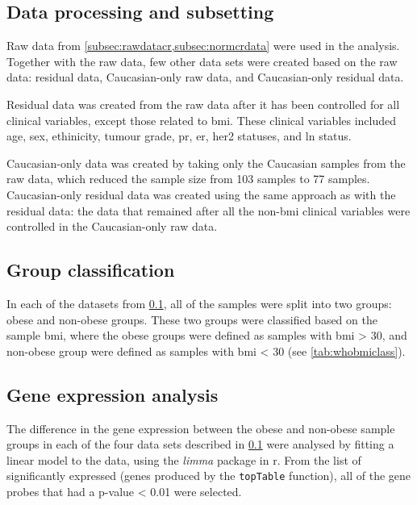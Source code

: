 \subsection{Data processing and subsetting}
\label{subsec:subdatadeg}

Raw data from \cref{subsec:rawdatacr,subsec:normcrdata} were used in the analysis.
Together with the raw data, few other data sets were created based on the raw data: residual data, Caucasian-only raw data, and Caucasian-only residual data.

Residual data was created from the raw data after it has been controlled for all clinical variables, except those related to \gls{bmi}.
These clinical variables included age, sex, ethinicity, tumour grade, \gls{pr}, \gls{er}, \gls{her2} statuses, and \gls{ln} status.

Caucasian-only data was created by taking only the Caucasian samples from the raw data, which reduced the sample size from 103 samples to 77 samples.
Caucasian-only residual data was created using the same approach as with the residual data: the data that remained after all the non-\gls{bmi} clinical variables were controlled in the Caucasian-only raw data.

\subsection{Group classification}
\label{subsec:crdegclass}

In each of the datasets from \cref{subsec:subdatadeg}, all of the samples were split into two groups: obese and non-obese groups.
These two groups were classified based on the sample \gls{bmi}, where the obese groups were defined as samples with \gls{bmi}  \textgreater{} 30, and non-obese group were defined as samples with \gls{bmi}  \textless{} 30 (see \cref{tab:whobmiclass}).

\subsection{Gene expression analysis}
\label{subsec:crdeg}

The difference in the gene expression between the obese and non-obese sample groups in each of the four data sets described in \cref{subsec:subdatadeg} were analysed by fitting a linear model to the data, using the \textit{limma} package in \gls{r}.
From the list of significantly expressed (genes produced by the \texttt{topTable} function), all of the gene probes that had a p-value \textless{} 0.01 were selected.


